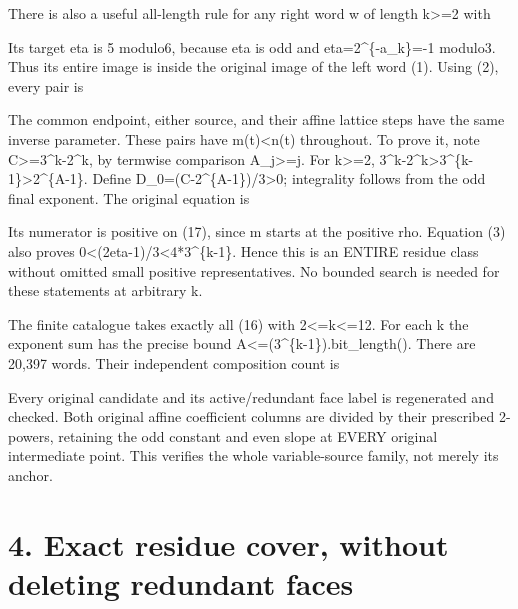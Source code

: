 There is also a useful all-length rule for any right word w of length
k\textgreater=2 with


Its target eta is 5 modulo6, because eta is odd and
eta=2\^{}\{-a\_k\}=-1 modulo3. Thus its entire image is inside the
original image of the left word (1). Using (2), every pair is


The common endpoint, either source, and their affine lattice steps have
the same inverse parameter. These pairs have m(t)\textless n(t)
throughout. To prove it, note C\textgreater=3\^{}k-2\^{}k, by termwise
comparison A\_j\textgreater=j. For k\textgreater=2,
3\^{}k-2\^{}k\textgreater3\^{}\{k-1\}\textgreater2\^{}\{A-1\}. Define
D\_0=(C-2\^{}\{A-1\})/3\textgreater0; integrality follows from the odd
final exponent. The original equation is


Its numerator is positive on (17), since m starts at the positive rho.
Equation (3) also proves 0\textless(2eta-1)/3\textless4*3\^{}\{k-1\}.
Hence this is an ENTIRE residue class without omitted small positive
representatives. No bounded search is needed for these statements at
arbitrary k.

The finite catalogue takes exactly all (16) with
2\textless=k\textless=12. For each k the exponent sum has the precise
bound A\textless=(3\^{}\{k-1\}).bit\_length(). There are 20,397 words.
Their independent composition count is


Every original candidate and its active/redundant face label is
regenerated and checked. Both original affine coefficient columns are
divided by their prescribed 2-powers, retaining the odd constant and
even slope at EVERY original intermediate point. This verifies the whole
variable-source family, not merely its anchor.

\section{4. Exact residue cover, without deleting redundant faces}

